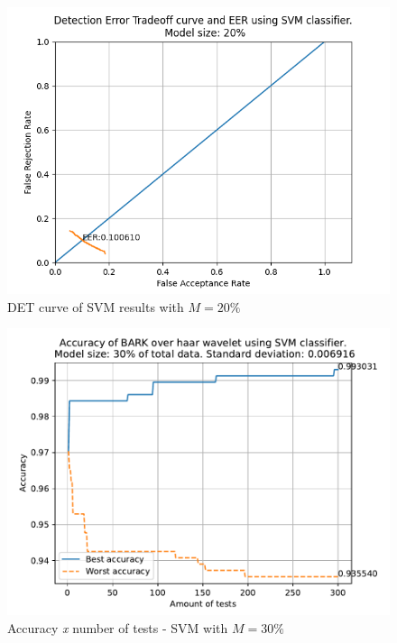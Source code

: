 	\begin{figure}[H]
		\centering
		\includegraphics[scale=.8]{images/results/det/DET_SVM_20}
		\caption{DET curve of SVM results with $M=20\%$}
		\label{fig:detsvm20}
	\end{figure}
	\begin{figure}[H]
		\centering
		\includegraphics[scale=.8]{images/results/confusionMatrices/classifier_SVM_30.pdf}
		\caption{Accuracy \textit{x} number of tests - SVM with $M=30\%$}
		\label{fig:classifiersvm30}
	\end{figure}
